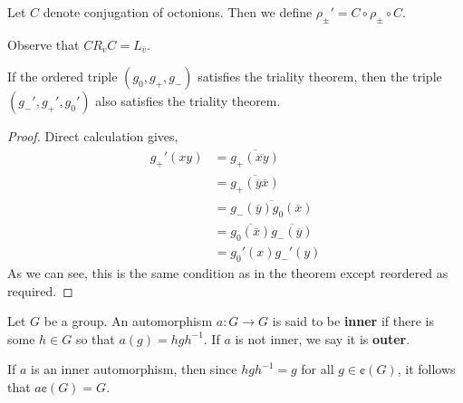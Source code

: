 \begin{defn}
    Let $C$ denote conjugation of octonions. Then we define $\rho_{\pm}' = C\circ \rho_{\pm}\circ C$.
\end{defn}
\begin{remark*}
    Observe that $C R_v C =L_{\overline{v}}$.
\end{remark*}
\begin{lemma}
    If the ordered triple $(g_0,g_+,g_-)$ satisfies the triality theorem, then the triple $(g_-',g_+',g_0')$ also satisfies the triality theorem.
\end{lemma}
\begin{proof}
Direct calculation gives,
    \begin{align*}
g_+'(xy)&=\overline{g_+(\overline{xy})}\\&=\overline{g_+(\overline{y}\overline{x})}\\&=\overline{g_-(\overline{y})g_0(\overline{x})}\\
        &=\overline{g_0(\overline{x})}\overline{g_-(\overline{y})}\\&= g_0'(x)g_-'(y)
    \end{align*}
    As we can see, this is the same condition as in the theorem except reordered as required.
\end{proof}
\begin{defn}
Let $G$ be a group. An automorphism $a : G\to G$ is said to be \textbf{inner} if there is some $h\in G$ so that $a(g) = hgh^{-1}$. If $a$ is not inner, we say it is \textbf{outer}.
\end{defn}
\begin{remark*}
    If $a$ is an inner automorphism, then since $hgh^{-1}=g$ for all $g \in \cent(G)$, it follows that $a\cent(G) = G$.
\end{remark*}

